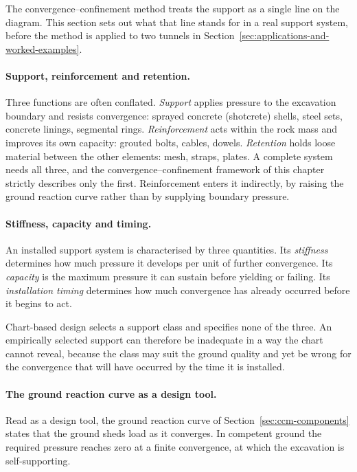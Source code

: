 The convergence--confinement method treats the support as a single line on
the diagram. This section sets out what that line stands for in a real
support system, before the method is applied to two tunnels in
Section~\ref{sec:applications-and-worked-examples}.

\paragraph{Support, reinforcement and retention.}
Three functions are often conflated. \emph{Support} applies pressure to
the excavation boundary and resists convergence: sprayed concrete (shotcrete) shells, steel sets,
concrete linings, segmental rings. \emph{Reinforcement} acts within the rock
mass and improves its own capacity: grouted bolts, cables, dowels.
\emph{Retention} holds loose material between the other elements: mesh,
straps, plates. A complete system needs all three, and the
convergence--confinement framework of this chapter strictly describes only the
first. Reinforcement enters it indirectly, by raising the ground reaction
curve rather than by supplying boundary pressure.

\paragraph{Stiffness, capacity and timing.}
An installed support system is characterised by three quantities. Its
\emph{stiffness} determines how much pressure it develops per unit of further
convergence. Its \emph{capacity} is the maximum pressure it can sustain before
yielding or failing. Its \emph{installation timing} determines how much
convergence has already occurred before it begins to act.

Chart-based design selects a support class and specifies none of the three.
An empirically selected support can therefore be inadequate in a way the chart
cannot reveal, because the class may suit the ground quality and yet be wrong
for the convergence that will have occurred by the time it is installed.

\paragraph{The ground reaction curve as a design tool.}
Read as a design tool, the ground reaction curve of
Section~\ref{sec:ccm-components} states that the ground sheds load as it
converges. In competent ground the required pressure reaches zero at a finite
convergence, at which the excavation is self-supporting.

